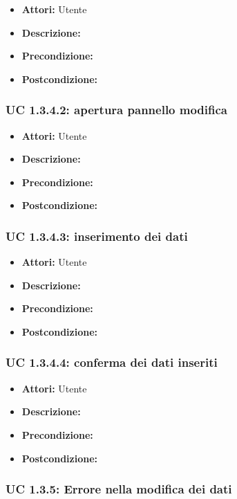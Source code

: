 \begin{itemize}
\item \textbf{Attori:} Utente
\item \textbf{Descrizione:} 
\item \textbf{Precondizione:} 
\item \textbf{Postcondizione:} 
\end{itemize}

\subsubsection{UC 1.3.4.2: apertura pannello modifica}

\begin{itemize}
\item \textbf{Attori:} Utente
\item \textbf{Descrizione:} 
\item \textbf{Precondizione:} 
\item \textbf{Postcondizione:} 
\end{itemize}

\subsubsection{UC 1.3.4.3: inserimento dei dati}

\begin{itemize}
\item \textbf{Attori:} Utente
\item \textbf{Descrizione:} 
\item \textbf{Precondizione:} 
\item \textbf{Postcondizione:} 
\end{itemize}

\subsubsection{UC 1.3.4.4: conferma dei dati inseriti}

\begin{itemize}
\item \textbf{Attori:} Utente
\item \textbf{Descrizione:} 
\item \textbf{Precondizione:} 
\item \textbf{Postcondizione:} 
\end{itemize}

\subsubsection{UC 1.3.5: Errore nella modifica dei dati}

